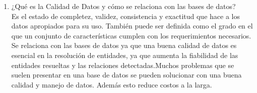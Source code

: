 \documentclass[12pt]{article}
\begin{document}
\begin{enumerate}
      \item ¿Qué es la Calidad de Datos y cómo se relaciona con las
      bases de datos?\\
      Es  el estado de completez, validez, consistencia y exactitud
      que hace a los datos apropiados para su uso. También puede ser
      definida como el grado en el que un conjunto de características
      cumplen con los requerimientos necesarios.
      Se relaciona con las bases de datos ya que una buena calidad de
      datos es esencial en la resolución de entidades, ya que aumenta la fiabilidad de las entidades resueltas y las relaciones
      detectadas.Muchos problemas que se suelen presentar en una base
      de datos se pueden solucionar con una buena calidad y manejo
      de datos. Además esto reduce costos a la larga.



 \end{enumerate}
\begin{thebibliography}
\end{thebibliography}
\end{document}
